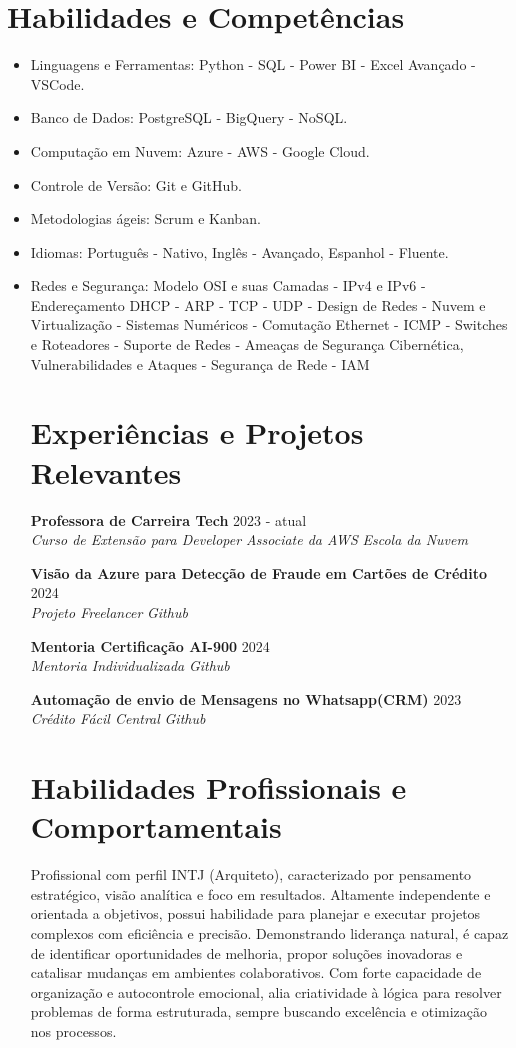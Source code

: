 \documentclass[a4paper,10pt]{article}
\newcommand{\entry}[4]{
  \noindent\textbf{#1} \hfill #2 \\
  \noindent\textit{#3} \hfill \textit{#4} \\
  \vspace{2pt}
}
\begin{document}
\section*{Habilidades e Competências}
\vspace{0.6em}
\begin{itemize}
\setlength\itemsep{0em}
\item Linguagens e Ferramentas: Python - SQL - Power BI - Excel Avançado - VSCode.
\item Banco de Dados: PostgreSQL - BigQuery - NoSQL.
\item Computação em Nuvem: Azure - AWS - Google Cloud.
\item Controle de Versão: Git e GitHub.
\item Metodologias ágeis: Scrum e Kanban.
\item Idiomas: Português - Nativo, Inglês - Avançado, Espanhol - Fluente.
\item Redes e Segurança: Modelo OSI e suas Camadas - IPv4 e IPv6 - Endereçamento DHCP - ARP - TCP - UDP - Design de Redes - Nuvem e Virtualização - Sistemas Numéricos - Comutação Ethernet - ICMP - Switches e Roteadores - Suporte de Redes - Ameaças de Segurança Cibernética, Vulnerabilidades e Ataques - Segurança de Rede - IAM

\section*{Experiências e Projetos Relevantes}
\vspace{0.6em}

\entry{Professora de Carreira Tech }{2023 - atual}{Curso de Extensão para  Developer Associate da AWS}{Escola da Nuvem}

\entry{Visão da Azure para Detecção de Fraude em Cartões de Crédito }{2024}{Projeto Freelancer}{Github}

\entry{Mentoria Certificação AI-900}{2024}{Mentoria Individualizada}{Github}

\entry{Automação de envio de Mensagens no Whatsapp(CRM)}{2023}{Crédito Fácil Central}{ Github}

\section*{Habilidades Profissionais e Comportamentais}
\vspace{0.6em}

Profissional com perfil INTJ (Arquiteto), caracterizado por pensamento estratégico, visão analítica e foco em resultados. Altamente independente e orientada a objetivos, possui habilidade para planejar e executar projetos complexos com eficiência e precisão. Demonstrando liderança natural, é capaz de identificar oportunidades de melhoria, propor soluções inovadoras e catalisar mudanças em ambientes colaborativos. Com forte capacidade de organização e autocontrole emocional, alia criatividade à lógica para resolver problemas de forma estruturada, sempre buscando excelência e otimização nos processos.

\end{itemize}
\end{document}
